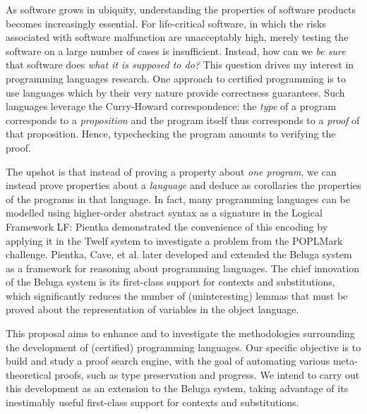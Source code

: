 \documentclass[12pt,letterpaper]{article}
\begin{document}
As software grows in ubiquity, understanding the properties of software
products becomes increasingly essential. For life-critical software, in which
the risks associated with software malfunction are unacceptably high, merely
testing the software on a large number of cases is insufficient. Instead, how
can we \emph{be sure} that software does \emph{what it is supposed to do?} This
question drives my interest in programming languages research.
%
One approach to certified programming is to use languages which by their very
nature provide correctness guarantees. Such languages leverage the Curry-Howard
correspondence: the \emph{type} of a program corresponds to a
\emph{proposition} and the program itself thus corresponds to a \emph{proof} of
that proposition. Hence, typechecking the program amounts to verifying the
proof.

The upshot is that instead of proving a property about \emph{one program}, we
can instead prove properties about a \emph{language} and deduce as corollaries
the properties of the programs in that language.
In fact, many programming languages can be modelled using higher-order
abstract syntax\cite{hoas} as a signature in the Logical Framework LF\cite{lf}:
Pientka demonstrated\cite{bp-proof-pearl} the convenience of this encoding by
applying it in the Twelf\cite{twelf} system to investigate a problem from the
POPLMark challenge\cite{poplmark}.
Pientka, Cave, et al. later developed and extended the
Beluga\cite{beluga,subst-beluga,inductive-beluga} system as a framework for
reasoning about programming languages.
The chief innovation of the Beluga system is its first-class support for
contexts and substitutions, which significantly reduces the number of
(uninteresting) lemmas that must be proved about the representation of
variables in the object language.

%

This proposal aims to enhance and to investigate the methodologies surrounding
the development of (certified) programming languages.
Our specific objective is to build and study a proof search engine, with the
goal of automating various meta-theoretical proofs, such as type preservation
and progress.
We intend to carry out this development as an extension to the Beluga system,
taking advantage of its inestimably useful first-class support for contexts and
substitutions.
\end{document}
